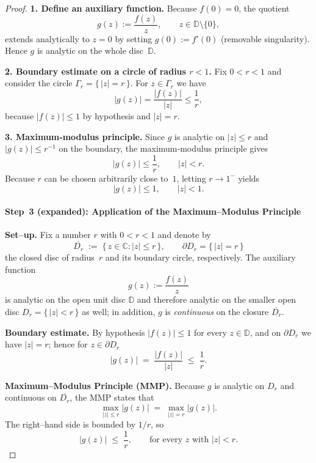 \documentclass[12pt]{article}
\theoremstyle{definition} %
\theoremstyle{plain} %
\begin{document}
      \begin{proof}
      \textbf{1.  Define an auxiliary function.}
      Because $f(0)=0$, the quotient
      \[
         g(z):=\frac{f(z)}{z},
         \qquad z\in\mathbb{D}\setminus\{0\},
      \]
      extends analytically to $z=0$ by setting $g(0):=f'(0)$ (removable
      singularity).  Hence $g$ is analytic on the whole disc $\mathbb{D}$.
      
      \medskip
      \textbf{2.  Boundary estimate on a circle of radius $r<1$.}
      Fix $0<r<1$ and consider the circle $\Gamma_r=\{\,|z|=r\,\}$.
      For $z\in\Gamma_r$ we have
      \[
         |g(z)|
         =\frac{|f(z)|}{|z|}
         \le\frac{1}{r},
      \]
      because $|f(z)|\le 1$ by hypothesis and $|z|=r$.
      
      \medskip
      \textbf{3.  Maximum‑modulus principle.}
      Since $g$ is analytic on $|z|\le r$ and $|g(z)|\le r^{-1}$ on the
      boundary, the maximum‑modulus principle gives
      \[
         |g(z)|\le \frac{1}{r},
         \qquad |z|<r.
      \]
      Because $r$ can be chosen arbitrarily close to $1$, letting $r\to 1^{-}$
      yields
      \[
         |g(z)|\le 1,
         \qquad |z|<1.
      \]
      
      \medskip
\paragraph{Step 3 (expanded):  Application of the Maximum–Modulus Principle}

\textbf{Set–up.}  
Fix a number $r$ with $0<r<1$ and denote by
\[
   \overline{D_r}\;:=\;\{\,z\in\mathbb{C} : |z|\le r\,\}, 
   \qquad 
   \partial D_r=\{\,|z|=r\,\}
\]
the closed disc of radius $r$ and its boundary circle, respectively.
The auxiliary function
\[
   g(z):=\frac{f(z)}{z}
\]
is analytic on the open unit disc $\mathbb{D}$ and therefore analytic on the
smaller open disc $D_r=\{\,|z|<r\,\}$ as well; in addition, $g$ is
\emph{continuous} on the closure $\overline{D_r}$.

\medskip
\textbf{Boundary estimate.}  
By hypothesis $|f(z)|\le 1$ for every $z\in\mathbb{D}$, and on $\partial D_r$
we have $|z|=r$; hence for $z\in\partial D_r$
\[
   |g(z)|
   \;=\;\frac{|f(z)|}{|z|}
   \;\le\;\frac{1}{r}.
\]

\medskip
\textbf{Maximum–Modulus Principle (MMP).}  
Because $g$ is analytic on $D_r$ and continuous on $\overline{D_r}$,
the MMP states that
\[
   \max_{|z|\le r}|g(z)|
   \;=\;
   \max_{|z|=r}|g(z)|.
\]
The right–hand side is bounded by $1/r$, so
\[
   |g(z)|\;\le\;\frac{1}{r},
   \qquad
   \text{for every }z\text{ with }|z|<r.
\]


\end{proof}
\end{document}
